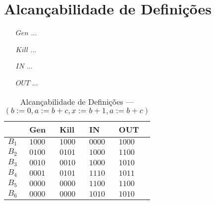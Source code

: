\section{Alcan\c{c}abilidade de Defini\c{c}\~oes}

\begin{itemize}
  \item[$Gen$] ...
  \item[$Kill$] ...
  \item[$IN$] ...
  \item[$OUT$] ...
\end{itemize}

\begin{table}[ht]
\centering
\begin{tabular}{l|l|l|l|l}
	& Gen & Kill & IN & OUT\\
\hline
$B_{1}$ &  $1000$ & $1000$ & $0000$ & $1000$\\
$B_{2}$ &  $0100$ & $0101$ & $1000$ & $1100$\\
$B_{3}$ &  $0010$ & $0010$ & $1000$ & $1010$\\
$B_{4}$ &  $0001$ & $0101$ & $1110$ & $1011$\\
$B_{5}$ &  $0000$ & $0000$ & $1100$ & $1100$\\
$B_{6}$ &  $0000$ & $0000$ & $1010$ & $1010$\\
\end{tabular}
\caption{Alcan\c{c}abilidade de Defini\c{c}\~oes --- $(b:=0, a:=b+c, x:=b+1, a:=b+c)$}
\end{table}


